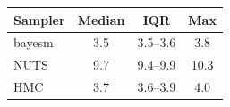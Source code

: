 \begin{tabular}{lccc}
\toprule
Sampler & Median & IQR & Max \\
\midrule
bayesm & 3.5 & 3.5--3.6 & 3.8 \\
NUTS & 9.7 & 9.4--9.9 & 10.3 \\
HMC & 3.7 & 3.6--3.9 & 4.0 \\
\bottomrule
\end{tabular}
